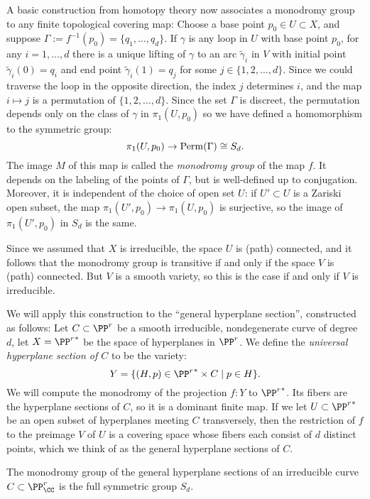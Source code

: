 A basic construction from homotopy theory now associates a monodromy group to any finite topological covering map: Choose a base point $p_0 \in U \subset X$, and suppose $\Gamma := f^{-1}(p_0)  = \{q_1,\dots,q_d\}$. If $\gamma$ is any loop in $U$ with base point $p_0$, for any $i = 1, \dots, d$ there is a unique lifting of $\gamma$ to an arc $\tilde \gamma_i$ in $V$ with initial point $\tilde \gamma_i(0) = q_i$ and end point $\tilde \gamma_i(1) = q_j$ for some $j \in \{1,2,\dots,d\}$. Since we could traverse the loop in the opposite direction, the index $j$ determines $i$, and the map $i\mapsto j$ is a permutation of $\{1,2,\dots,d\}$. 
Since the set $\Gamma$ is discreet, the permutation depends only on the class of $\gamma$ in $\pi_1(U,p_0)$ so we have defined a homomorphism to the symmetric group:
$$
\pi_1(U,p_0)  \to {\rm Perm}(\Gamma) \cong S_d.
$$
The image $M$ of this map is called the \emph{monodromy group} of the map $f$. It depends on the labeling of the points of $\Gamma$, but is well-defined  up to conjugation. Moreover, it is independent of the choice of open set $U$: if $U' \subset U$ is a Zariski open subset, the map $\pi_1(U', p_0) \to \pi_1(U,p_0)$ is surjective,  so the image of $\pi_1(U', p_0)$ in $S_d$ is the same.

Since we assumed that $X$ is irreducible, the space $U$ is (path) connected, and it follows that the monodromy group is transitive if and only if the space $V$ is (path) connected. But $V$ is a smooth
variety, so this is the case if and only if $V$ is irreducible.

We will apply this construction to the ``general hyperplane section'', constructed as follows:
Let $C \subset \PP^r$ be a smooth irreducible, nondegenerate curve of degree $d$, let $X = {\PP^r}^*$ be the space of hyperplanes in $\PP^r$. We define the \emph{universal hyperplane section of $C$} to be the variety:
$$
Y = \{ (H, p) \in {\PP^r}^* \times C \mid p \in H \}.
$$
We will compute the monodromy of the projection $f: Y$ to ${\PP^r}^*$. Its fibers are the hyperplane
sections of $C$, so it is a dominant finite map. If we let $U\subset {\PP^r}^*$ be an open subset of hyperplanes
meeting $C$ transversely, then the restriction of $f$ to the preimage $V$ of $U$ is a covering space
whose fibers each consist of $d$ distinct points, which we think of as the general hyperplane sections
of $C$.

\begin{theorem}\label{uniform position lemma}
The monodromy group of the general hyperplane sections of an irreducible curve $C \subset \PP^r_\CC$ is the full symmetric group $S_d$.
\end{theorem}

